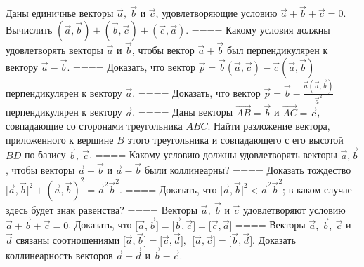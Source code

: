 Даны единичнье векторы \(\overrightarrow{a},\ \overrightarrow{b}\) и \(\overrightarrow{c}\), удовлетворяющие условию \(\overrightarrow{a} + \overrightarrow{b} + \overrightarrow{c} = 0\). Вычислить \(\left( \overrightarrow{a},\overrightarrow{b} \right) + \left( \overrightarrow{b},\overrightarrow{c} \right) + \left( \overrightarrow{c},\overrightarrow{a} \right)\).
====
Какому условия должны удовлетворять векторы \(\overrightarrow{a}\) и \(\overrightarrow{b}\), чтобы вектор \(\overrightarrow{a} + \overrightarrow{b}\) был перпендикулярен к вектору \(\overrightarrow{a} - \overrightarrow{b}\).
====
Доказать, что вектор \(\overrightarrow{p} = \overrightarrow{b}(\overrightarrow{a},\overrightarrow{c}) - \overrightarrow{c}(\overrightarrow{a},\overrightarrow{b})\) перпендикулярен к вектору \(\overrightarrow{a}\).
====
Доказать, что вектор \(\overrightarrow{p} = \overrightarrow{b} - \frac{\overrightarrow{a}(\overrightarrow{a},\overrightarrow{b})}{{\overrightarrow{a}}^{2}}\) перпендикулярен к вектору \(\overrightarrow{a}\).
====
Даны векторы \(\overrightarrow{AB} = \overrightarrow{b}\) и \(\overrightarrow{AC} = \overrightarrow{c}\), совпадающие со сторонами треугольника \(ABC\). Найти разложение вектора, приложенного к вершине \(B\) этого треугольника и совпадающего с его высотой \(BD\) по базису \(\overrightarrow{b},\ \overrightarrow{c}\).
====
Какому условию должны удовлетворять векторы \(\overrightarrow{a},\overrightarrow{b}\), чтобы векторы \(\overrightarrow{a} + \overrightarrow{b}\) и \(\overrightarrow{a} - \overrightarrow{b}\) были коллинеарны?
====
Доказать тождество \(\lbrack\overrightarrow{a},\overrightarrow{b}\rbrack^{2} + (\overrightarrow{a},\overrightarrow{b})^{2} = {\overrightarrow{a}}^{2}{\overrightarrow{b}}^{2}\).
====
Доказать, что \(\lbrack\overrightarrow{a},\overrightarrow{b}\rbrack^{2} <  {\overrightarrow{a}}^{2}{\overrightarrow{b}}^{2}\); в каком случае здесь будет знак равенства?
====
Векторы \(\overrightarrow{a},\ \overrightarrow{b}\) и \(\overrightarrow{c}\) удовлетворяют условию \(\overrightarrow{a} + \overrightarrow{b} + \overrightarrow{c} = 0\). Доказать, что \(\lbrack\overrightarrow{a},\overrightarrow{b}\rbrack = \lbrack\overrightarrow{b},\overrightarrow{c}\rbrack = \lbrack\overrightarrow{c},\overrightarrow{a}\rbrack\)
====
Векторы \(\overrightarrow{a},\ \overrightarrow{b},\ \overrightarrow{c}\) и \(\overrightarrow{d}\) связаны соотношениями \(\lbrack\overrightarrow{a},\overrightarrow{b}\rbrack = \lbrack\overrightarrow{c},\overrightarrow{d}\rbrack,\ \ \lbrack\overrightarrow{a},\overrightarrow{c}\rbrack = \lbrack\overrightarrow{b},\overrightarrow{d}\rbrack\). Доказать коллинеарность векторов \(\overrightarrow{a} - \overrightarrow{d}\) и \(\overrightarrow{b} - \overrightarrow{c}\).
